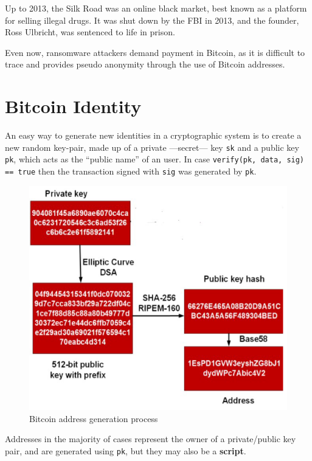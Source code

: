 Up to 2013, the Silk Road was an online black market, best known as a platform for selling illegal drugs. It was shut down by the FBI in 2013, and the founder, Ross Ulbricht, was sentenced to life in prison.

Even now, ransomware attackers demand payment in Bitcoin, as it is difficult to trace and provides pseudo anonymity through the use of Bitcoin addresses.

\section{Bitcoin Identity}
An easy way to generate new identities in a cryptographic system is to create a new random key-pair, made up of a private ---secret--- key \texttt{sk} and a public key \texttt{pk}, which acts as the ``public name'' of an user.
In case  \texttt{verify(pk, data, sig) == true} then the transaction signed with \texttt{sig} was generated by \texttt{pk}. 

\begin{figure}[htbp]
   \centering
   \includegraphics{images/bitcoin_addressgen.png}
   \caption{Bitcoin address generation process}
   \label{fig:bitcoin_addressgen}
\end{figure}

Addresses in the majority of cases represent the owner of a private/public key pair, and are generated using \texttt{pk}, but they may also be a \textbf{script}.

